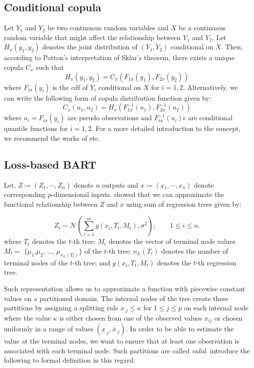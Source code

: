 \documentclass{amsart}
\begin{document}
\subsection{Conditional copula}
Let $Y_1$ and $Y_2$ be two continuous random variables and $X$ be a continuous random variable that might affect the relationship between $Y_1$ and $Y_2$. Let $H_x(y_1,y_2)$ denotes the joint distribution of $(Y_1,Y_2)$ conditional on $X$. Then, according to Patton's\cite{patton2006} interpretation of Sklar's\cite{sklar:1959} theorem, there exists a unique copula $C_x$ such that
\begin{equation*}
	H_x(y_1,y_2) = C_x(F_{1x}(y_1),F_{2x}(y_2))
\end{equation*}
where $F_{ix}(y_i)$ is the cdf of $Y_i$ conditional on $X$ for $i=1,2$. Alternatively, we can write the following form of copula distribution function given by:
\begin{equation*}
	C_x(u_1,u_2) = H_x\left(F_{1x}^{-1}(u_1),F_{2x}^{-1}(u_2)\right)
\end{equation*}
where $u_i = F_{ix}(y_i)$ are pseudo observations and $F_{ix}^{-1}(u_i)$s are conditional quantile functions
for $i=1,2$. For a more detailed introduction to the concept, we recommend the works of \citet{patton2006,acar2010,GIJBELS20111919} etc.

\subsection{Loss-based BART}

Let, $Z\coloneqq(Z_1,\cdots,Z_n)$ denote $n$ outputs and $x\coloneqq(x_1,\cdots,x_n)$ denote corresponding $p$-dimensional inputs. \citet{chipman2010BART} showed that we can approximate the functional relationship between $Z$ and $x$ using sum of regression trees given by:

\begin{equation}\label{eq:BART}
	Z_i \sim \mathcal{N}\left(\sum_{t=1}^m g(x_i, T_t, M_t),\sigma^2\right);\qquad 1\le i\le n.
\end{equation}
where $T_t$ denotes the $t$-th tree; $M_t$ denotes the vector of terminal node values $M_t =$ $\{\mu_1$,$\mu_2$, \dots, $\mu_{n_L(T_t)}\}$ of the $t$-th tree; $n_L(T_t)$ denotes the number of terminal nodes of the $t$-th tree; and $g(x_i, T_t, M_t)$ denotes the $t$-th regression tree.

Such representation allows us to approximate a function with piecewise constant values on a partitioned domain. The internal nodes of the tree create these partitions by assigning a splitting rule $x_{\cdot j}\le \kappa$ for $1\le j \le p$ on each internal node where the value $\kappa$ is either chosen from one of the observed values $x_{ij}$ or chosen uniformly in a range of values $(\underline{x}_{\cdot j},\overline{x}_{\cdot j})$. In order to be able to estimate the value at the terminal nodes, we want to ensure that at least one observation is associated with each terminal node. Such partitions are called \textit{valid}.  \citet{serafini2024lossbasedpriortreetopologies} introduce the following to formal definition in this regard.
\end{document}
